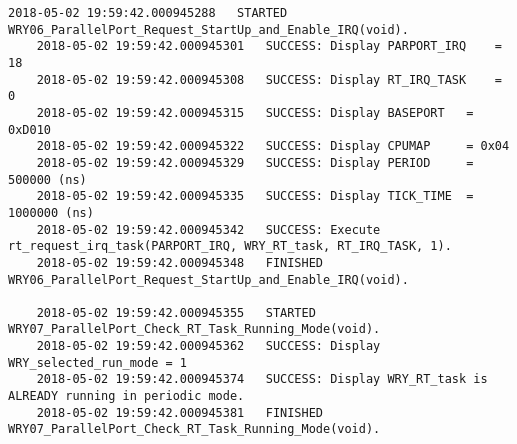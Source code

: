 \begin{landscape}
\begin{lstlisting}[caption={C/C++ Code excerpt for Real Time (RTAI)}, label=C/C++-Code-excerpt-for-Real-Time-(RTAI)]
	2018-05-02 19:59:42.000945288 	STARTED  WRY06_ParallelPort_Request_StartUp_and_Enable_IRQ(void).
	2018-05-02 19:59:42.000945301 	SUCCESS: Display PARPORT_IRQ 	= 18
	2018-05-02 19:59:42.000945308 	SUCCESS: Display RT_IRQ_TASK 	= 0
	2018-05-02 19:59:42.000945315 	SUCCESS: Display BASEPORT 	= 0xD010
	2018-05-02 19:59:42.000945322 	SUCCESS: Display CPUMAP 	= 0x04
	2018-05-02 19:59:42.000945329 	SUCCESS: Display PERIOD 	= 500000 (ns)
	2018-05-02 19:59:42.000945335 	SUCCESS: Display TICK_TIME 	= 1000000 (ns)
	2018-05-02 19:59:42.000945342 	SUCCESS: Execute rt_request_irq_task(PARPORT_IRQ, WRY_RT_task, RT_IRQ_TASK, 1).
	2018-05-02 19:59:42.000945348 	FINISHED WRY06_ParallelPort_Request_StartUp_and_Enable_IRQ(void).
	
	2018-05-02 19:59:42.000945355 	STARTED  WRY07_ParallelPort_Check_RT_Task_Running_Mode(void).
	2018-05-02 19:59:42.000945362 	SUCCESS: Display WRY_selected_run_mode = 1
	2018-05-02 19:59:42.000945374 	SUCCESS: Display WRY_RT_task is ALREADY running in periodic mode.
	2018-05-02 19:59:42.000945381 	FINISHED WRY07_ParallelPort_Check_RT_Task_Running_Mode(void).
	

\end{lstlisting}
\end{landscape}
